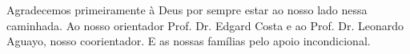 \begin{agradecimentos}
Agradecemos primeiramente à Deus por sempre estar ao nosso lado nessa caminhada. Ao nosso orientador Prof. Dr. Edgard Costa e ao Prof. Dr. Leonardo Aguayo, nosso coorientador. E as nossas famílias pelo apoio incondicional. 
\end{agradecimentos}